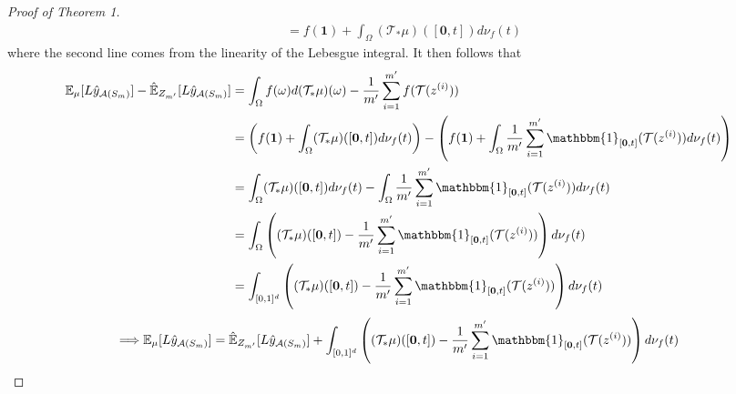 \documentclass{article}
\begin{document}
\begin{proof}[Proof of Theorem 1]
\begin{align*}
        & = f(\mathbf{1}) + \int_{\Omega} (\mathcal{T}_{*}\mu)([\mathbf{0}, t]) d\nu_f (t)
    \end{align*}
    where the second line comes from the linearity of the Lebesgue integral. It then follows that
    \begin{align*}
        \mathbb{E}_{\mu}[L \hat{y}_{\mathcal{A}(S_m)}] - \hat{\mathbb{E}}_{Z_{m'}}[L \hat{y}_{\mathcal{A}(S_m)}] & = \int_{\Omega} f(\omega) d(\mathcal{T}_{*}\mu)(\omega) -  \frac{1}{m'} \sum_{i=1}^{m'} f(\mathcal{T}(z^{(i)})) \\
        & = \left(f(\mathbf{1}) + \int_{\Omega} (\mathcal{T}_{*}\mu)([\mathbf{0}, t]) d\nu_f (t) \right) - \left( f(\mathbf{1}) + \int_{\Omega} \frac{1}{m'} \sum_{i=1}^{m'} \mathbbm{1}_{[\mathbf{0}, t]}(\mathcal{T}(z^{(i)})) d\nu_f (t) \right) \\
        & = \int_{\Omega} (\mathcal{T}_{*}\mu)([\mathbf{0}, t]) d\nu_f (t) - \int_{\Omega} \frac{1}{m'} \sum_{i=1}^{m'} \mathbbm{1}_{[\mathbf{0}, t]}(\mathcal{T}(z^{(i)})) d\nu_f (t) \\
        & = \int_{\Omega} \left( (\mathcal{T}_{*}\mu)([\mathbf{0}, t]) -  \frac{1}{m'} \sum_{i=1}^{m'} \mathbbm{1}_{[\mathbf{0}, t]}(\mathcal{T}(z^{(i)})) \right) d\nu_f (t) \\
        & = \int_{[0, 1]^d} \left( (\mathcal{T}_{*}\mu)([\mathbf{0}, t]) -  \frac{1}{m'} \sum_{i=1}^{m'} \mathbbm{1}_{[\mathbf{0}, t]}(\mathcal{T}(z^{(i)})) \right) d\nu_f (t)
    \end{align*}
    \[\Longrightarrow \mathbb{E}_{\mu}[L \hat{y}_{\mathcal{A}(S_m)}] = \hat{\mathbb{E}}_{Z_{m'}}[L \hat{y}_{\mathcal{A}(S_m)}] + \int_{[0, 1]^d} \left( (\mathcal{T}_{*}\mu)([\mathbf{0}, t]) -  \frac{1}{m'} \sum_{i=1}^{m'} \mathbbm{1}_{[\mathbf{0}, t]}(\mathcal{T}(z^{(i)})) \right) d\nu_f (t)\]


\end{proof}
\end{document}
